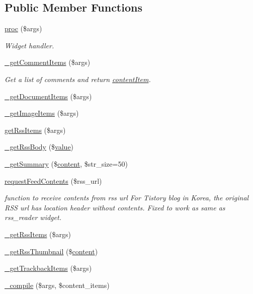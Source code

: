 \subsection*{Public Member Functions}
\begin{DoxyCompactItemize}
\item 
\hyperlink{classcontent_aacac5eb20ef4b64552d77bd5d2e2bf99}{proc} (\$args)
\begin{DoxyCompactList}\small\item\em Widget handler. \end{DoxyCompactList}\item 
\hyperlink{classcontent_a257f112a3719c28356bd49c336d3ad2f}{\+\_\+get\+Comment\+Items} (\$args)
\begin{DoxyCompactList}\small\item\em Get a list of comments and return \hyperlink{classcontentItem}{content\+Item}. \end{DoxyCompactList}\item 
\hyperlink{classcontent_ac3e0ed7e0c14712bd93e68cae1603e2f}{\+\_\+get\+Document\+Items} (\$args)
\item 
\hyperlink{classcontent_abdff6ddbe036e410913b5da1b9a5ce1b}{\+\_\+get\+Image\+Items} (\$args)
\item 
\hyperlink{classcontent_a78e600f4e35fe539b4ae34218d702e04}{get\+Rss\+Items} (\$args)
\item 
\hyperlink{classcontent_a75dcd12f149001ea88ceb13a286ce040}{\+\_\+get\+Rss\+Body} (\$\hyperlink{common_2js_2jquery_8js_abe5393d870043cf6aaa1d5ad5fce755c}{value})
\item 
\hyperlink{classcontent_ae3e4dc54c21e3ac9eb67d547d914661a}{\+\_\+get\+Summary} (\$\hyperlink{classcontent}{content}, \$str\+\_\+size=50)
\item 
\hyperlink{classcontent_a6f9991d17df1b915196ca159512552a1}{request\+Feed\+Contents} (\$rss\+\_\+url)
\begin{DoxyCompactList}\small\item\em function to receive contents from rss url For Tistory blog in Korea, the original R\+SS url has location header without contents. Fixed to work as same as rss\+\_\+reader widget. \end{DoxyCompactList}\item 
\hyperlink{classcontent_aa541a575f915fc5fddbd5075a545d991}{\+\_\+get\+Rss\+Items} (\$args)
\item 
\hyperlink{classcontent_afe1cfad315cf8f3aeb352b22d0020142}{\+\_\+get\+Rss\+Thumbnail} (\$\hyperlink{classcontent}{content})
\item 
\hyperlink{classcontent_a4cdf2e0d2ede8a8bca1c61526f920adc}{\+\_\+get\+Trackback\+Items} (\$args)
\item 
\hyperlink{classcontent_a297e1dd4d257abab532a9a9d99847ee8}{\+\_\+compile} (\$args, \$content\+\_\+items)
\end{DoxyCompactItemize}
